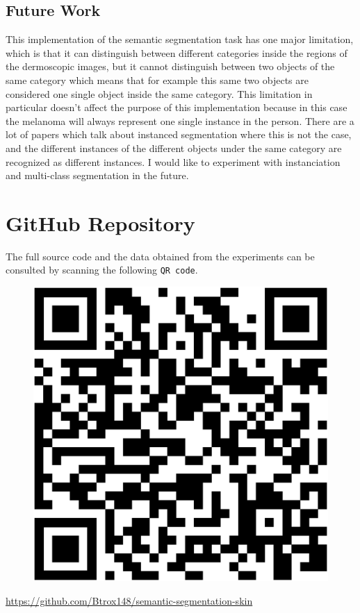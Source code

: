 \subsection{Future Work}
This implementation of the semantic segmentation task has one major limitation, which is that it can distinguish between different categories inside the regions of the dermoscopic images, but it cannot distinguish between two objects of the same category which means that for example this same two objects are considered one single object inside the same category. This limitation in particular doesn't affect the purpose of this implementation because in this case the melanoma will always represent one single instance in the person. There are a lot of papers which talk about instanced segmentation where this is not the case, and the different instances of the different objects under the same category are recognized as different instances. I would like to experiment with instanciation and multi-class segmentation in the future. 

\section{GitHub Repository}

The full source code and the data obtained from the experiments can be consulted by scanning the following \texttt{QR code}.

\begin{figure}[h]
  \centering
  \includegraphics[width=0.65\columnwidth]{repoqr.eps}
\end{figure}
\hspace{-1cm}
\url{https://github.com/Btrox148/semantic-segmentation-skin}

